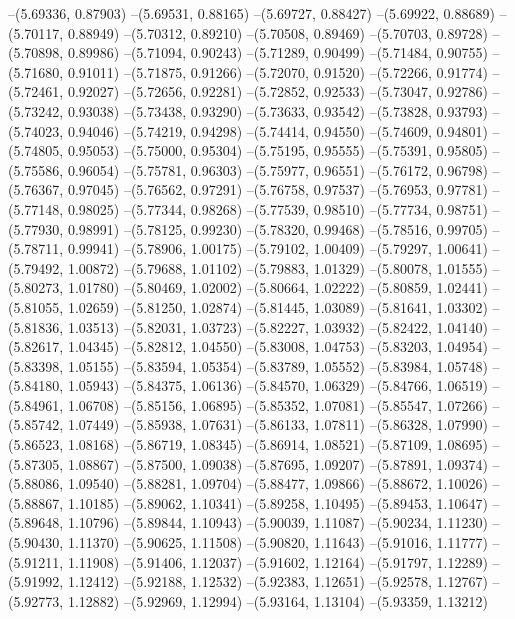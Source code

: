 --(5.69336, 0.87903)
--(5.69531, 0.88165)
--(5.69727, 0.88427)
--(5.69922, 0.88689)
--(5.70117, 0.88949)
--(5.70312, 0.89210)
--(5.70508, 0.89469)
--(5.70703, 0.89728)
--(5.70898, 0.89986)
--(5.71094, 0.90243)
--(5.71289, 0.90499)
--(5.71484, 0.90755)
--(5.71680, 0.91011)
--(5.71875, 0.91266)
--(5.72070, 0.91520)
--(5.72266, 0.91774)
--(5.72461, 0.92027)
--(5.72656, 0.92281)
--(5.72852, 0.92533)
--(5.73047, 0.92786)
--(5.73242, 0.93038)
--(5.73438, 0.93290)
--(5.73633, 0.93542)
--(5.73828, 0.93793)
--(5.74023, 0.94046)
--(5.74219, 0.94298)
--(5.74414, 0.94550)
--(5.74609, 0.94801)
--(5.74805, 0.95053)
--(5.75000, 0.95304)
--(5.75195, 0.95555)
--(5.75391, 0.95805)
--(5.75586, 0.96054)
--(5.75781, 0.96303)
--(5.75977, 0.96551)
--(5.76172, 0.96798)
--(5.76367, 0.97045)
--(5.76562, 0.97291)
--(5.76758, 0.97537)
--(5.76953, 0.97781)
--(5.77148, 0.98025)
--(5.77344, 0.98268)
--(5.77539, 0.98510)
--(5.77734, 0.98751)
--(5.77930, 0.98991)
--(5.78125, 0.99230)
--(5.78320, 0.99468)
--(5.78516, 0.99705)
--(5.78711, 0.99941)
--(5.78906, 1.00175)
--(5.79102, 1.00409)
--(5.79297, 1.00641)
--(5.79492, 1.00872)
--(5.79688, 1.01102)
--(5.79883, 1.01329)
--(5.80078, 1.01555)
--(5.80273, 1.01780)
--(5.80469, 1.02002)
--(5.80664, 1.02222)
--(5.80859, 1.02441)
--(5.81055, 1.02659)
--(5.81250, 1.02874)
--(5.81445, 1.03089)
--(5.81641, 1.03302)
--(5.81836, 1.03513)
--(5.82031, 1.03723)
--(5.82227, 1.03932)
--(5.82422, 1.04140)
--(5.82617, 1.04345)
--(5.82812, 1.04550)
--(5.83008, 1.04753)
--(5.83203, 1.04954)
--(5.83398, 1.05155)
--(5.83594, 1.05354)
--(5.83789, 1.05552)
--(5.83984, 1.05748)
--(5.84180, 1.05943)
--(5.84375, 1.06136)
--(5.84570, 1.06329)
--(5.84766, 1.06519)
--(5.84961, 1.06708)
--(5.85156, 1.06895)
--(5.85352, 1.07081)
--(5.85547, 1.07266)
--(5.85742, 1.07449)
--(5.85938, 1.07631)
--(5.86133, 1.07811)
--(5.86328, 1.07990)
--(5.86523, 1.08168)
--(5.86719, 1.08345)
--(5.86914, 1.08521)
--(5.87109, 1.08695)
--(5.87305, 1.08867)
--(5.87500, 1.09038)
--(5.87695, 1.09207)
--(5.87891, 1.09374)
--(5.88086, 1.09540)
--(5.88281, 1.09704)
--(5.88477, 1.09866)
--(5.88672, 1.10026)
--(5.88867, 1.10185)
--(5.89062, 1.10341)
--(5.89258, 1.10495)
--(5.89453, 1.10647)
--(5.89648, 1.10796)
--(5.89844, 1.10943)
--(5.90039, 1.11087)
--(5.90234, 1.11230)
--(5.90430, 1.11370)
--(5.90625, 1.11508)
--(5.90820, 1.11643)
--(5.91016, 1.11777)
--(5.91211, 1.11908)
--(5.91406, 1.12037)
--(5.91602, 1.12164)
--(5.91797, 1.12289)
--(5.91992, 1.12412)
--(5.92188, 1.12532)
--(5.92383, 1.12651)
--(5.92578, 1.12767)
--(5.92773, 1.12882)
--(5.92969, 1.12994)
--(5.93164, 1.13104)
--(5.93359, 1.13212)
